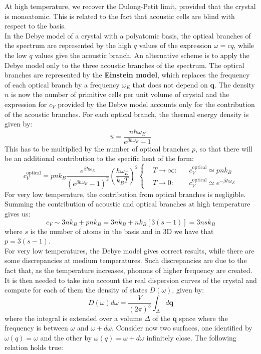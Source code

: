 \documentclass[10.75pt,a4paper,openright,bottom=2cm]{article}
\renewcommand{\Vec}[1]{\boldsymbol{#1}}
\begin{document}
At high temperature, we recover the Dulong-Petit limit, provided that the crystal is monoatomic. This is related to the fact that acoustic cells are blind with respect to the basis.\\
In the Debye model of a crystal with a polyatomic basis, the optical branches of the spectrum are represented by the high $q$ values of the expression $\omega=cq$, while the low $q$ values give the acoustic branch. An alternative scheme is to apply the Debye model only to the three acoustic branches of the spectrum. The optical branches are represented by the \textbf{Einstein model}, which replaces the frequency of each optical branch by a frequency $\omega_E$ that does not depend on $\Vec{q}$. The density $n$ is now the number of primitive cells per unit volume of crystal and the expression for $c_V$ provided by the Debye model accounts only for the contribution of the acoustic branches. For each optical branch, the thermal energy density is given by:
\[
u=\frac{n\hbar\omega_E}{e^{\beta\hbar\omega_E}-1}
\]
This has to be multiplied by the number of optical branches $p$, so that there will be an additional contribution to the specific heat of the form:
\[
c_V^{\text{optical}}=pnk_B\frac{e^{\beta\hbar\omega_E}}{(e^{\beta\hbar\omega_E}-1)^2}\left(\frac{\hbar\omega_E}{k_BT}\right)^2
\left\{
\begin{aligned}
&T\to\infty: &&c_V^{\text{optical}}\simeq pnk_B\\
&T\to0: &&c_V^{\text{optical}}\simeq e^{-\beta\hbar\omega_E}
\end{aligned}
\right.
\]
For very low temperature, the contribution from optical branches is negligible. Summing the contribution of acoustic and optical branches at high temperature gives us:
\[
c_V\sim3nk_B+pnk_B=3nk_B+nk_B[3(s-1)]=3nsk_B
\]
where $s$ is the number of atoms in the basis and in 3D we have that $p=3(s-1)$.\\
For very low temperatures, the Debye model gives correct results, while there are some discrepancies at medium temperatures. Such discrepancies are due to the fact that, as the temperature increases, phonons of higher frequency are created. It is then needed to take into account the real dispersion curves of the crystal and compute for each of them the density of states $D(\omega)$, given by:
\[
D(\omega)d\omega=\frac{V}{(2\pi)^3}\int_\Delta d\Vec{q}
\]
where the integral is extended over a volume $\Delta$ of the $\Vec{q}$ space where the frequency is between $\omega$ and $\omega+d\omega$. Consider now two surfaces, one identified by $\omega(q)=\omega$ and the other by $\omega(q)=\omega+d\omega$ infinitely close. The following relation holds true:
\end{document}
